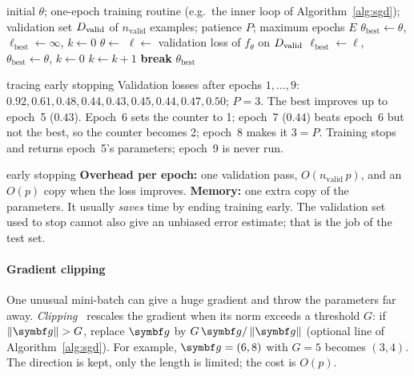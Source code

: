 \documentclass[11pt]{article}
\newcommand{\gvec}{\vect{g}}
\begin{document}
\begin{algorithm}[tb]
\caption{Early stopping with patience}\label{alg:early}
\begin{algorithmic}[1]
\Require initial $\theta$; one-epoch training routine (e.g.\ the inner loop of Algorithm~\ref{alg:sgd}); validation set $D_{\mathrm{valid}}$ of $n_{\text{valid}}$ examples; patience $P$; maximum epochs $E$
  \State $\theta_{\text{best}} \gets \theta$, \quad $\ell_{\text{best}} \gets \infty$, \quad $k \gets 0$ 
    \State $\theta \gets$  
    \State $\ell \gets$ validation loss of $f_\theta$ on $D_{\mathrm{valid}}$ 
      \State $\ell_{\text{best}} \gets \ell$, \quad $\theta_{\text{best}} \gets \theta$, \quad $k \gets 0$ 
    \Else
      \State $k \gets k + 1$
       \textbf{break} \EndIf
    \EndIf
  \EndFor
  \State \Return $\theta_{\text{best}}$
\EndFunction
\end{algorithmic}
\end{algorithm}


\begin{worked}{tracing early stopping}
Validation losses after epochs $1, \dots, 9$: $0.92, 0.61, 0.48, 0.44, 0.43, 0.45, 0.44, 0.47, 0.50$; $P = 3$. The best
improves up to epoch~5 ($0.43$). Epoch~6 sets the counter to 1; epoch~7 ($0.44$) beats epoch~6 but not the best, so
the counter becomes 2; epoch~8 makes it $3 = P$. Training stops and returns epoch~5's parameters; epoch~9 is never run.
\end{worked}

\begin{runtime}{early stopping}
\textbf{Overhead per epoch:} one validation pass, $O(n_{\text{valid}}\,p)$, and an $O(p)$ copy when the loss improves.
\textbf{Memory:} one extra copy of the parameters. It usually \emph{saves} time by ending training early. The
validation set used to stop cannot also give an unbiased error estimate; that is the job of the test set.
\end{runtime}

\paragraph{Gradient clipping} One unusual mini-batch can give a huge gradient and throw the parameters far away. \emph{Clipping}~\cite{pascanu2013} rescales the gradient when its norm exceeds a threshold $G$: if
$\norm{\gvec} > G$, replace $\gvec$ by $G\,\gvec/\norm{\gvec}$ (optional line of Algorithm~\ref{alg:sgd}). For example,
$\gvec = (6, 8)$ with $G = 5$ becomes $(3, 4)$. The direction is kept, only the length is limited; the cost is $O(p)$.
\end{document}
